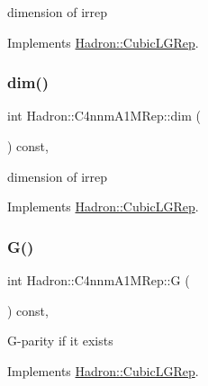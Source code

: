 dimension of irrep 

Implements \mbox{\hyperlink{structHadron_1_1CubicLGRep_a3acbaea26503ed64f20df693a48e4cdd}{Hadron\+::\+Cubic\+L\+G\+Rep}}.

\mbox{\label{structHadron_1_1C4nnmA1MRep_afb797b4baebc8d261c96fd1f173825b6}} 
\subsubsection{\texorpdfstring{dim()}{dim()}\hspace{0.1cm}{\footnotesize\ttfamily [3/3]}}
{\footnotesize\ttfamily int Hadron\+::\+C4nnm\+A1\+M\+Rep\+::dim (\begin{DoxyParamCaption}{ }\end{DoxyParamCaption}) const\hspace{0.3cm}{\ttfamily [inline]}, {\ttfamily [virtual]}}

dimension of irrep 

Implements \mbox{\hyperlink{structHadron_1_1CubicLGRep_a3acbaea26503ed64f20df693a48e4cdd}{Hadron\+::\+Cubic\+L\+G\+Rep}}.

\mbox{\label{structHadron_1_1C4nnmA1MRep_a80fdc5fe56a8c2c040f46f97a4bee86a}} 
\subsubsection{\texorpdfstring{G()}{G()}\hspace{0.1cm}{\footnotesize\ttfamily [1/3]}}
{\footnotesize\ttfamily int Hadron\+::\+C4nnm\+A1\+M\+Rep\+::G (\begin{DoxyParamCaption}{ }\end{DoxyParamCaption}) const\hspace{0.3cm}{\ttfamily [inline]}, {\ttfamily [virtual]}}

G-\/parity if it exists 

Implements \mbox{\hyperlink{structHadron_1_1CubicLGRep_ace26f7b2d55e3a668a14cb9026da5231}{Hadron\+::\+Cubic\+L\+G\+Rep}}.

\mbox{\label{structHadron_1_1C4nnmA1MRep_a80fdc5fe56a8c2c040f46f97a4bee86a}} 
